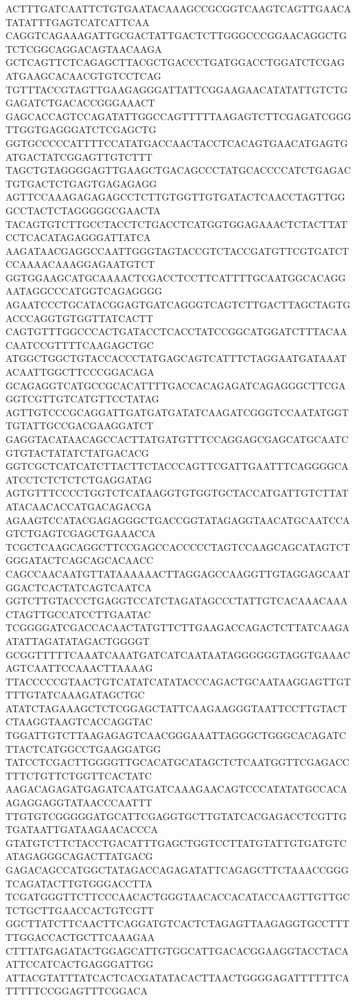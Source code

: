 ACTTTGATCAATTCTGTGAATACAAAGCCGCGGTCAAGTCAGTTGAACATATATTTGAGTCATCATTCAA
CAGGTCAGAAAGATTGCGACTATTGACTCTTGGGCCCGGAACAGGCTGTCTCGGCAGGACAGTAACAAGA
GCTCAGTTCTCAGAGCTTACGCTGACCCTGATGGACCTGGATCTCGAGATGAAGCACAACGTGTCCTCAG
TGTTTACCGTAGTTGAAGAGGGATTATTCGGAAGAACATATATTGTCTGGAGATCTGACACCGGGAAACT
GAGCACCAGTCCAGATATTGGCCAGTTTTTAAGAGTCTTCGAGATCGGGTTGGTGAGGGATCTCGAGCTG
GGTGCCCCCATTTTCCATATGACCAACTACCTCACAGTGAACATGAGTGATGACTATCGGAGTTGTCTTT
TAGCTGTAGGGGAGTTGAAGCTGACAGCCCTATGCACCCCATCTGAGACTGTGACTCTGAGTGAGAGAGG
AGTTCCAAAGAGAGAGCCTCTTGTGGTTGTGATACTCAACCTAGTTGGGCCTACTCTAGGGGGCGAACTA
TACAGTGTCTTGCCTACCTCTGACCTCATGGTGGAGAAACTCTACTTATCCTCACATAGAGGGATTATCA
AAGATAACGAGGCCAATTGGGTAGTACCGTCTACCGATGTTCGTGATCTCCAAAACAAAGGAGAATGTCT
GGTGGAAGCATGCAAAACTCGACCTCCTTCATTTTGCAATGGCACAGGAATAGGCCCATGGTCAGAGGGG
AGAATCCCTGCATACGGAGTGATCAGGGTCAGTCTTGACTTAGCTAGTGACCCAGGTGTGGTTATCACTT
CAGTGTTTGGCCCACTGATACCTCACCTATCCGGCATGGATCTTTACAACAATCCGTTTTCAAGAGCTGC
ATGGCTGGCTGTACCACCCTATGAGCAGTCATTTCTAGGAATGATAAATACAATTGGCTTCCCGGACAGA
GCAGAGGTCATGCCGCACATTTTGACCACAGAGATCAGAGGGCTTCGAGGTCGTTGTCATGTTCCTATAG
AGTTGTCCCGCAGGATTGATGATGATATCAAGATCGGGTCCAATATGGTTGTATTGCCGACGAAGGATCT
GAGGTACATAACAGCCACTTATGATGTTTCCAGGAGCGAGCATGCAATCGTGTACTATATCTATGACACG
GGTCGCTCATCATCTTACTTCTACCCAGTTCGATTGAATTTCAGGGGCAATCCTCTCTCTCTGAGGATAG
AGTGTTTCCCCTGGTCTCATAAGGTGTGGTGCTACCATGATTGTCTTATATACAACACCATGACAGACGA
AGAAGTCCATACGAGAGGGCTGACCGGTATAGAGGTAACATGCAATCCAGTCTGAGTCGAGCTGAAACCA
TCGCTCAAGCAGGCTTCCGAGCCACCCCCTAGTCCAAGCAGCATAGTCTGGGATACTCAGCAGCACAACC
CAGCCAACAATGTTATAAAAAACTTAGGAGCCAAGGTTGTAGGAGCAATGGACTCACTATCAGTCAATCA
GGTCTTGTACCCTGAGGTCCATCTAGATAGCCCTATTGTCACAAACAAACTAGTTGCCATCCTTGAATAC
TCGGGGATCGACCACAACTATGTTCTTGAAGACCAGACTCTTATCAAGAATATTAGATATAGACTGGGGT
GCGGTTTTTCAAATCAAATGATCATCAATAATAGGGGGGTAGGTGAAACAGTCAATTCCAAACTTAAAAG
TTACCCCCGTAACTGTCATATCATATACCCAGACTGCAATAAGGAGTTGTTTTGTATCAAAGATAGCTGC
ATATCTAGAAAGCTCTCGGAGCTATTCAAGAAGGGTAATTCCTTGTACTCTAAGGTAAGTCACCAGGTAC
TGGATTGTCTTAAGAGAGTCAACGGGAAATTAGGGCTGGGCACAGATCTTACTCATGGCCTGAAGGATGG
TATCCTCGACTTGGGGTTGCACATGCATAGCTCTCAATGGTTCGAGACCTTTCTGTTCTGGTTCACTATC
AAGACAGAGATGAGATCAATGATCAAAGAACAGTCCCATATATGCCACAAGAGGAGGTATAACCCAATTT
TTGTGTCGGGGGATGCATTCGAGGTGCTTGTATCACGAGACCTCGTTGTGATAATTGATAAGAACACCCA
GTATGTCTTCTACCTGACATTTGAGCTGGTCCTTATGTATTGTGATGTCATAGAGGGCAGACTTATGACG
GAGACAGCCATGGCTATAGACCAGAGATATTCAGAGCTTCTAAACCGGGTCAGATACTTGTGGGACCTTA
TCGATGGGTTCTTCCCAACACTGGGTAACACCACATACCAAGTTGTTGCTCTGCTTGAACCACTGTCGTT
GGCTTATCTTCAACTTCAGGATGTCACTCTAGAGTTAAGAGGTGCCTTTTTGGACCACTGCTTCAAAGAA
CTTTATGAGATACTGGAGCATTGTGGCATTGACACGGAAGGTACCTACAATTCCATCACTGAGGGATTGG
ATTACGTATTTATCACTCACGATATACACTTAACTGGGGAGATTTTTTCATTTTTCCGGAGTTTCGGACA
